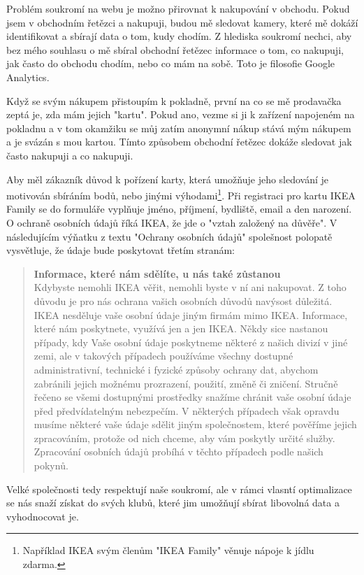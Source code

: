 \documentclass[bc,female,java,dept456]{diploma}						%
\begin{document}
Problém soukromí na webu je možno přirovnat k nakupování v obchodu. Pokud jsem v obchodním řetězci a nakupuji, budou mě sledovat kamery, které mě dokáží identifikovat a sbírají data o tom, kudy chodím. Z hlediska soukromí nechci, aby bez mého souhlasu o mě sbíral obchodní řetězec informace o tom, co nakupuji, jak často do obchodu chodím, nebo co mám na sobě. Toto je filosofie Google Analytics.

Když se svým nákupem přistoupím k pokladně, první na co se mě prodavačka zeptá je, zda mám jejich "kartu". Pokud ano, vezme si ji k zařízení napojeném na pokladnu a v tom okamžiku se můj zatím anonymní nákup stává mým nákupem a je svázán s mou kartou. Tímto způsobem obchodní řetězec dokáže sledovat jak často nakupuji a co nakupuji.

Aby měl zákazník důvod k pořízení karty, která umožňuje jeho sledování je motivován sbíráním bodů, nebo jinými výhodami\footnote{Například IKEA svým členům "IKEA Family" věnuje nápoje k jídlu zdarma.}. Při registraci pro kartu IKEA Family se do formuláře vyplňuje jméno, příjmení, bydliště, email a den narození. O ochraně osobních údajů říká IKEA, že jde o "vztah založený na důvěře". V následujícím výňatku z textu "Ochrany osobních údajů" spolešnost polopatě vysvětluje, že údaje bude poskytovat třetím stranám:

\begin{quote}
{\bf Informace, které nám sdělíte, u nás také zůstanou}\\
Kdybyste nemohli IKEA věřit, nemohli byste v ní ani nakupovat. Z toho důvodu je pro nás ochrana vašich osobních důvodů navýsost důležitá. IKEA nesděluje vaše osobní údaje jiným firmám mimo IKEA. Informace, které nám poskytnete, využívá jen a jen IKEA. Někdy sice nastanou případy, kdy Vaše osobní údaje poskytneme některé z našich divizí v jiné zemi, ale v takových případech používáme všechny dostupné administrativní, technické i fyzické způsoby ochrany dat, abychom zabránili jejich možnému prozrazení, použití, změně či zničení. Stručně řečeno se všemi dostupnými prostředky snažíme chránit vaše osobní údaje před předvídatelným nebezpečím. V některých případech však opravdu musíme některé vaše údaje sdělit jiným společnostem, které pověříme jejich zpracováním, protože od nich chceme, aby vám poskytly určité služby. Zpracování osobních údajů probíhá v těchto případech podle našich pokynů. 
\end{quote}

Velké společnosti tedy respektují naše soukromí, ale v rámci vlasntí optimalizace se nás snaží získat do svých klubů, které jim umožňují sbírat libovolná data a vyhodnocovat je.
\end{document}
